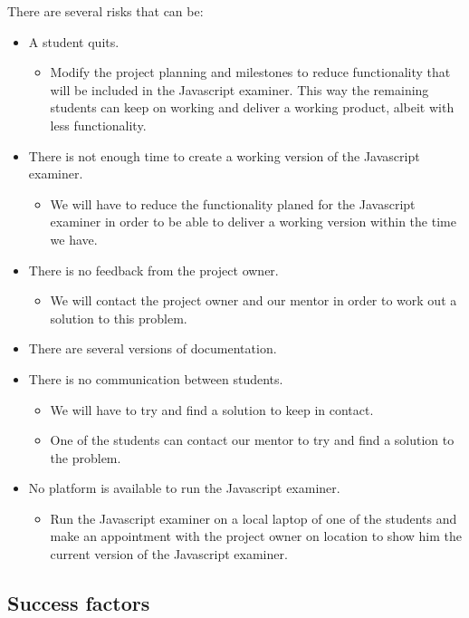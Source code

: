 \documentclass{article}
\begin{document}
There are several risks that can be:
\begin{itemize}
  \item A student quits.
    \begin{itemize}
      \item Modify the project planning and milestones to reduce functionality that will be included in the Javascript examiner. This way the remaining students can keep on working and deliver a working product, albeit with less functionality.
    \end{itemize}
  \item There is not enough time to create a working version of the Javascript examiner.
    \begin{itemize}
      \item We will have to reduce the functionality planed for the Javascript examiner in order to be able to deliver a working version within the time we have.
    \end{itemize}
  \item There is no feedback from the project owner.
    \begin{itemize}
      \item We will contact the project owner and our mentor in order to work out a solution to this problem.
    \end{itemize}
  \item There are several versions of documentation.
  \item There is no communication between students.
    \begin{itemize}
      \item We will have to try and find a solution to keep in contact.
      \item One of the students can contact our mentor to try and find a solution to the problem.
    \end{itemize}
  \item No platform is available to run the Javascript examiner.
    \begin{itemize}
      \item Run the Javascript examiner on a local laptop of one of the students and make an appointment with the project owner on location to show him the current version of the Javascript examiner.
    \end{itemize}
\end{itemize}

\subsection{Success factors}
\end{document}
